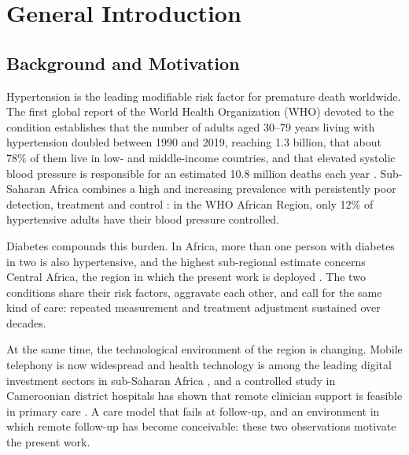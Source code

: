 \documentclass[12pt,a4paper,oneside]{report}
\begin{document}
\chapter{General Introduction}\label{ch:intro}

\section{Background and Motivation}\label{sec:intro-background}

Hypertension is the leading modifiable risk factor for premature death worldwide. The first global report of the World Health Organization (WHO) devoted to the condition establishes that the number of adults aged 30--79 years living with hypertension doubled between 1990 and 2019, reaching 1.3 billion, that about 78\% of them live in low- and middle-income countries, and that elevated systolic blood pressure is responsible for an estimated 10.8 million deaths each year \parencite{who2023hypertension}. Sub-Saharan Africa combines a high and increasing prevalence with persistently poor detection, treatment and control \parencite{gafane2024}: in the WHO African Region, only 12\% of hypertensive adults have their blood pressure controlled.

Diabetes compounds this burden. In Africa, more than one person with diabetes in two is also hypertensive, and the highest sub-regional estimate concerns Central Africa, the region in which the present work is deployed \parencite{hinneh2023}. The two conditions share their risk factors, aggravate each other, and call for the same kind of care: repeated measurement and treatment adjustment sustained over decades.

At the same time, the technological environment of the region is changing. Mobile telephony is now widespread and health technology is among the leading digital investment sectors in sub-Saharan Africa \parencite{segun2025}, and a controlled study in Cameroonian district hospitals has shown that remote clinician support is feasible in primary care \parencite{bediang2021}. A care model that fails at follow-up, and an environment in which remote follow-up has become conceivable: these two observations motivate the present work.
\end{document}

